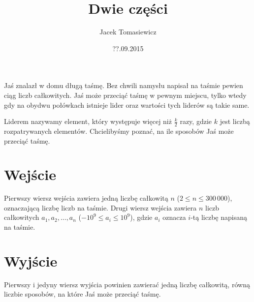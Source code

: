 \documentclass[zad,zawodnik,utf8]{sinol}
\title{Dwie części}
\author{Jacek Tomasiewicz} %
\date{??.09.2015}
\begin{document}
  \begin{tasktext}%
Jaś znalazł w domu długą taśmę. Bez chwili namysłu napisał na taśmie pewien ciąg liczb całkowitych.
Jaś może przeciąć taśmę w pewnym miejscu, tylko wtedy gdy na obydwu połówkach
istnieje lider oraz wartości tych liderów są takie same.

Liderem nazywamy element, który występuje więcej niż $\frac{k}{2}$ razy, 
gdzie $k$ jest liczbą rozpatrywanych elementów. 
Chcielibyśmy poznać, na ile sposobów Jaś może przeciąć taśmę.

  \section{Wejście}
Pierwszy wiersz wejścia zawiera jedną liczbę całkowitą $n$ ($2 \leq n \leq 300\,000$), oznaczającą
liczbę liczb na taśmie. Drugi wiersz wejścia zawiera $n$ liczb całkowitych $a_1, a_2, \ldots, a_n$
($-10^9 \leq a_i \leq 10^9$), gdzie $a_i$ oznacza $i$-tą liczbę napisaną na taśmie.

  \section{Wyjście}
Pierwszy i jedyny wiersz wyjścia powinien zawierać jedną liczbę całkowitą, równą liczbie
sposobów, na które Jaś może przeciąć taśmę.

     \makecompactexample    

  \end{tasktext}
\end{document}
